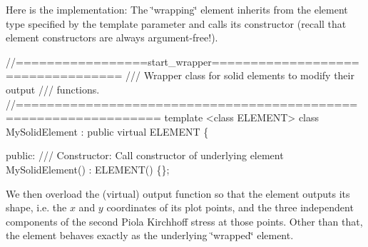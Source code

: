 Here is the implementation\+: The \char`\"{}wrapping\char`\"{} element inherits from the element type specified by the template parameter and calls its constructor (recall that element constructors are always argument-\/free!).

 
\begin{DoxyCodeInclude}
\textcolor{comment}{//=================start\_wrapper==================================}
\textcolor{comment}{/// Wrapper class for solid elements to modify their output }
\textcolor{comment}{}\textcolor{comment}{/// functions.}
\textcolor{comment}{}\textcolor{comment}{//================================================================}
\textcolor{keyword}{template} <\textcolor{keyword}{class} ELEMENT>
\textcolor{keyword}{class }MySolidElement : \textcolor{keyword}{public} \textcolor{keyword}{virtual} ELEMENT
\{

\textcolor{keyword}{public}:
\textcolor{comment}{}
\textcolor{comment}{ /// Constructor: Call constructor of underlying element}
\textcolor{comment}{} MySolidElement() : ELEMENT() \{\};

\end{DoxyCodeInclude}


We then overload the (virtual) output function so that the element outputs its shape, i.\+e. the $ x $ and $ y $ coordinates of its plot points, and the three independent components of the second Piola Kirchhoff stress at those points. Other than that, the element behaves exactly as the underlying \char`\"{}wrapped\char`\"{} element.


